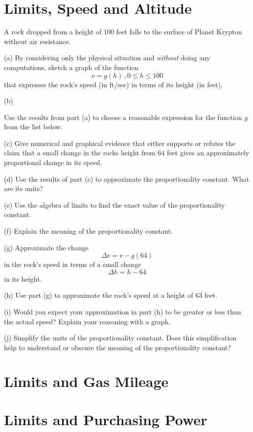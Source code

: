 \documentclass{ximera}
\begin{document}
\section{Limits, Speed and Altitude}
\begin{example}  \label{Ex:deft4}
A rock dropped from a height of $100$ feet falls to the surface of Planet Krypton without air resistance.

(a) By considering only the physical situation and \emph{without} doing any computations, sketch a graph of the function
\[
    v =g(h) \, , 0\leq h \leq 100
\]
that expresses the rock's speed (in ft/sec) in terms of its height (in feet).

(b) \begin{question} \label{Qerfr45rt}

Use the results from part (a) to choose a reasonable expression for the function $g$ from the list below.

\begin{multipleChoice}
\end{multipleChoice}
\end{question}

(c)  Give numerical  and graphical evidence that either supports or refutes the claim that a small change in the rocks height from $64$ feet gives an approximately proportional change in its speed.
  
(d) Use the results of part (c) to approximate the proportionality constant. What are its units?

(e) Use the algebra of limits to find the exact value of the proportionality constant.

(f) Explain the meaning of the proportionality constant.

(g) Approximate the change
\[
    \Delta v = v - g(64)
\]
in the rock's speed in terms of a small change
\[
  \Delta h = h - 64
\]
in its height.

(h) Use part (g) to approximate the rock's speed at a height of $63$ feet.

(i) Would you expect your approximation in part (h) to be greater or less than the actual speed? Explain your reasoning with a graph.

(j) Simplify the units of the proportionality constant. Does this simplification help to understand or obscure the meaning of the proportionality constant?
\end{example}


\section{Limits and Gas Mileage}


\section{Limits and Purchasing Power}
\end{document}
